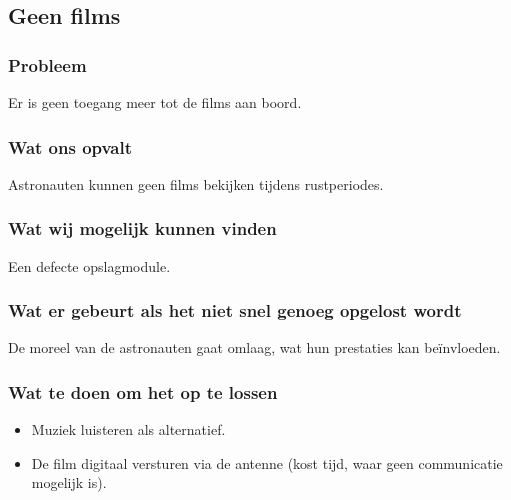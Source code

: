 \subsection{Geen films}

\subsubsection{Probleem}
Er is geen toegang meer tot de films aan boord.

\subsubsection{Wat ons opvalt}
Astronauten kunnen geen films bekijken tijdens rustperiodes.

\subsubsection{Wat wij mogelijk kunnen vinden}
Een defecte opslagmodule.

\subsubsection{Wat er gebeurt als het niet snel genoeg opgelost wordt}
De moreel van de astronauten gaat omlaag, wat hun prestaties kan beïnvloeden.

\subsubsection{Wat te doen om het op te lossen}
\begin{itemize}
    \item Muziek luisteren als alternatief.
    \item De film digitaal versturen via de antenne (kost tijd, waar geen communicatie mogelijk is).
\end{itemize}